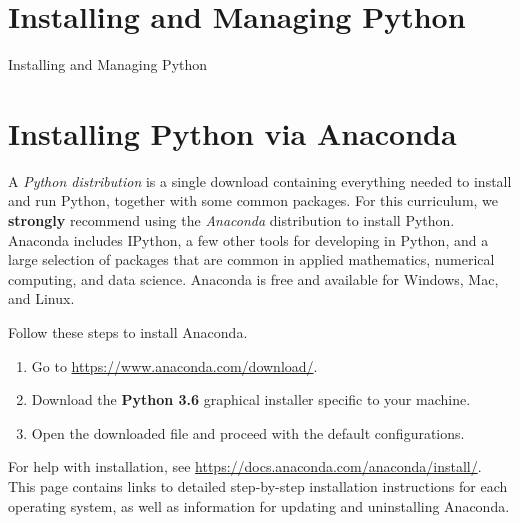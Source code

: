 \section{Installing and Managing Python}{Installing and Managing Python}
\label{pythoninstall}


\section*{Installing Python via Anaconda} %




A \emph{Python distribution} is a single download containing everything needed to install and run Python, together with some common packages.
For this curriculum, we \textbf{strongly} recommend using the \emph{Anaconda} distribution to install Python.
Anaconda includes IPython, a few other tools for developing in Python, and a large selection of packages that are common in applied mathematics, numerical computing, and data science.
Anaconda is free and available for Windows, Mac, and Linux.

Follow these steps to install Anaconda.
\begin{enumerate}
\item Go to \url{https://www.anaconda.com/download/}.
\item Download the \textbf{Python 3.6} graphical installer specific to your machine.
\item Open the downloaded file and proceed with the default configurations.
\end{enumerate}

For help with installation, see \url{https://docs.anaconda.com/anaconda/install/}.
This page contains links to detailed step-by-step installation instructions for each operating system, as well as information for updating and uninstalling Anaconda.

